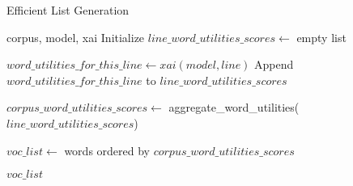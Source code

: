 \begin{algorithm}
\caption{Efficient List Generation}
\label{alg:efficient-list-generation}
\begin{algorithmic}[1]
\Require corpus, model, xai
\State Initialize $line\_word\_utilities\_scores \gets$ empty list

    \State $word\_utilities\_for\_this\_line \gets xai(model, line)$
    \State Append $word\_utilities\_for\_this\_line$ to $line\_word\_utilities\_scores$
\EndFor

\State $corpus\_word\_utilities\_scores \gets$ aggregate\_word\_utilities($line\_word\_utilities\_scores$)

\State $voc\_list \gets$ words ordered by $corpus\_word\_utilities\_scores$

\State \Return $voc\_list$
\end{algorithmic}
\end{algorithm}

